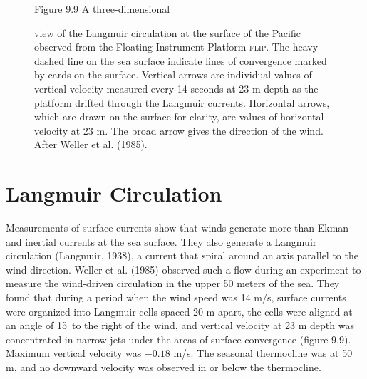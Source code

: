 \begin{figure}[t!]
\footnotesize
Figure 9.9 A three-dimensional \rule{0mm}{3ex}view of the Langmuir
circulation at the surface of the Pacific observed from the Floating
Instrument Platform \textsc{flip}. The heavy dashed line on the sea
surface indicate lines of convergence marked by cards on the
surface. Vertical arrows are individual values of vertical velocity
measured every 14 seconds at 23 m depth as the platform drifted
through the Langmuir currents. Horizontal arrows, which are drawn on
the surface for clarity, are values of horizontal velocity at 23
m. The broad arrow gives the direction of the wind. After Weller et
al. (1985).
\label{fig:langmuir}
\vspace{-2ex}
\end{figure}

\section{Langmuir Circulation}
Measurements of surface currents show that
winds generate more than Ekman and inertial
currents at the sea surface.  They also
generate a Langmuir circulation (Langmuir, 1938), a current that
spiral around an axis parallel to the wind direction. Weller et
al. (1985) observed such a flow during an experiment to measure the
wind-driven circulation in the upper 50 meters of the sea.  They found
that during a period when the wind speed was 14 m/s, surface currents
were organized into Langmuir cells spaced 20 m apart, the cells were
aligned at an angle of 15\degrees\ to the right of the wind, and
vertical velocity at 23 m depth was concentrated in narrow jets under
the areas of surface convergence (figure 9.9).  Maximum vertical
velocity was $-0.18$ m/s. The seasonal
thermocline was at 50 m, and no downward
velocity was observed in or below the thermocline.

